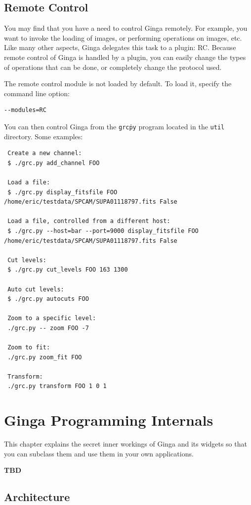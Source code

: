 \documentclass[11pt]{report}
\begin{document}
\section{Remote Control}
\label{sec:remotecontrol}
You may find that you have a need to control Ginga remotely.  For
example, you want to invoke the loading of images, or performing
operations on images, etc.  Like many other aspects, Ginga delegates this
task to a plugin: RC.  
Because remote control of Ginga is handled by a plugin, you can easily
change the types of operations that can be done, or completely change
the protocol used.

The remote control module is not loaded by default.  To load it, specify
the command line option:
\begin{verbatim}
--modules=RC
\end{verbatim}

You can then control Ginga from the {\tt grc\.py} program located in the 
{\tt util} directory.  Some examples:
\begin{verbatim}
 Create a new channel:
 $ ./grc.py add_channel FOO
 
 Load a file:
 $ ./grc.py display_fitsfile FOO /home/eric/testdata/SPCAM/SUPA01118797.fits False

 Load a file, controlled from a different host:
 $ ./grc.py --host=bar --port=9000 display_fitsfile FOO /home/eric/testdata/SPCAM/SUPA01118797.fits False

 Cut levels:
 $ ./grc.py cut_levels FOO 163 1300

 Auto cut levels:
 $ ./grc.py autocuts FOO

 Zoom to a specific level:
 ./grc.py -- zoom FOO -7
 
 Zoom to fit:
 ./grc.py zoom_fit FOO
 
 Transform:
 ./grc.py transform FOO 1 0 1
\end{verbatim}

\chapter{Ginga Programming Internals}
\label{ch:internals}
This chapter explains the secret inner workings of Ginga and its widgets
so that you can subclass them and use them in your own applications.

\bf{TBD}

\section{Architecture}
\end{document}
